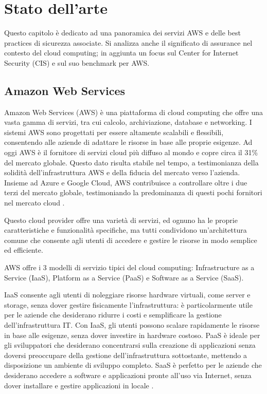\chapter{Stato dell'arte}
\label{cap:stato_arte}

Questo capitolo è dedicato ad una panoramica dei servizi AWS e delle best practices di sicurezza associate. Si analizza anche il significato di assurance nel contesto del cloud computing; in aggiunta un focus sul Center for Internet Security (CIS) e sul suo benchmark per AWS.

\section{Amazon Web Services}
\label{sec:aws}

Amazon Web Services (AWS) è una piattaforma di cloud computing che offre una vasta gamma di servizi, tra cui calcolo, archiviazione, database e networking. I sistemi AWS sono progettati per essere altamente scalabili e flessibili, consentendo alle aziende di adattare le risorse in base alle proprie esigenze. Ad oggi AWS è il fornitore di servizi cloud più diffuso al mondo e copre circa il 31\% del mercato globale. Questo dato risulta stabile nel tempo, a testimonianza della solidità dell'infrastruttura AWS e della fiducia del mercato verso l'azienda. Insieme ad Azure e Google Cloud, AWS contribuisce a controllare oltre i due terzi del mercato globale, testimoniando la predominanza di questi pochi fornitori nel mercato cloud \cite{statista2024awsmarketshare}.

Questo cloud provider offre una varietà di servizi, ed ognuno ha le proprie caratteristiche e funzionalità specifiche, ma tutti condividono un'architettura comune che consente agli utenti di accedere e gestire le risorse in modo semplice ed efficiente.

AWS offre i 3 modelli di servizio tipici del cloud computing: Infrastructure as a Service (IaaS), Platform as a Service (PaaS) e Software as a Service (SaaS).

IaaS consente agli utenti di noleggiare risorse hardware virtuali, come server e storage, senza dover gestire fisicamente l'infrastruttura: è particolarmente utile per le aziende che desiderano ridurre i costi e semplificare la gestione dell'infrastruttura IT. Con IaaS, gli utenti possono scalare rapidamente le risorse in base alle esigenze, senza dover investire in hardware costoso. PaaS è ideale per gli sviluppatori che desiderano concentrarsi sulla creazione di applicazioni senza doversi preoccupare della gestione dell'infrastruttura sottostante, mettendo a disposizione un ambiente di sviluppo completo. SaaS è perfetto per le aziende che desiderano accedere a software e applicazioni pronte all'uso via Internet, senza dover installare e gestire applicazioni in locale \cite{10823401}.

